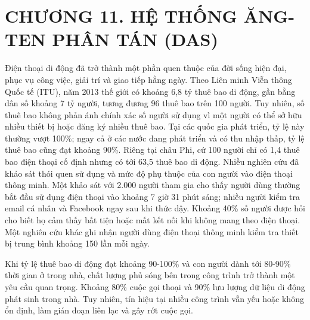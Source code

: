 \documentclass{thesis}
\begin{document}
{\let\oldnumberline\numberline
  \renewcommand{\numberline}{Hình~\oldnumberline}
\listoffigures}
\newpage

{\let\oldnumberline\numberline
  \renewcommand{\numberline}{Bảng~\oldnumberline}
\listoftables}
\newpage


\section*{CHƯƠNG 11. HỆ THỐNG ĂNG-TEN PHÂN TÁN (DAS)}
{} %

\setcounter{section}{11}
\setcounter{subsection}{0}
\setcounter{figure}{0}
\setcounter{table}{0}

Điện thoại di động đã trở thành một phần quen thuộc của đời sống hiện
đại, phục vụ công việc, giải trí và giao tiếp hằng ngày. Theo Liên
minh Viễn thông Quốc tế (ITU), năm 2013 thế giới có khoảng 6,8 tỷ
thuê bao di động, gần bằng dân số khoảng 7 tỷ người, tương đương 96
thuê bao trên 100 người. Tuy nhiên, số thuê bao không phản ánh chính
xác số người sử dụng vì một người có thể sở hữu nhiều thiết bị hoặc
đăng ký nhiều thuê bao. Tại các quốc gia phát triển, tỷ lệ này thường
vượt 100\%; ngay cả ở các nước đang phát triển và có thu nhập thấp, tỷ
lệ thuê bao cũng đạt khoảng 90\%. Riêng tại châu Phi, cứ 100 người
chỉ có 1,4 thuê bao điện thoại cố định nhưng có tới 63,5 thuê bao di động.
Nhiều nghiên cứu đã khảo sát thói quen sử dụng và mức độ phụ thuộc
của con người vào điện thoại thông minh. Một khảo sát với 2.000 người
tham gia cho thấy người dùng thường bắt đầu sử dụng điện thoại vào
khoảng 7 giờ 31 phút sáng; nhiều người kiểm tra email cá nhân và
Facebook ngay sau khi thức dậy. Khoảng 40\% số người được hỏi cho biết
họ cảm thấy bất tiện hoặc mất kết nối khi không mang theo điện
thoại. Một nghiên cứu khác ghi nhận người dùng điện thoại thông
minh kiểm tra thiết bị trung bình khoảng 150 lần mỗi ngày.

Khi tỷ lệ thuê bao di động đạt khoảng 90-100\% và con người dành tới
80-90\% thời gian ở trong nhà, chất lượng phủ sóng bên trong công
trình trở thành một yêu cầu quan trọng. Khoảng 80\% cuộc gọi thoại
và 90\% lưu lượng dữ liệu di động phát sinh trong nhà. Tuy nhiên,
tín hiệu tại nhiều công trình vẫn yếu hoặc không ổn định, làm gián
đoạn liên lạc và gây rớt cuộc gọi.
\end{document}
